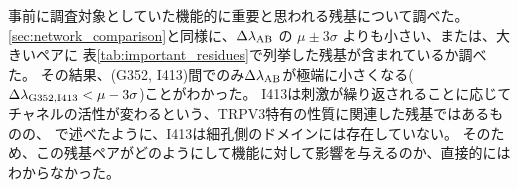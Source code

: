 事前に調査対象としていた機能的に重要と思われる残基について調べた。
\ref{sec:network_comparison}と同様に、$\Delta \lambda_{\rm{AB}}$ の $\mu \pm 3 \sigma$ よりも小さい、または、大きいペアに
表\ref{tab:important_residues}で列挙した残基が含まれているか調べた。
その結果、(G352, I413)間でのみ$\Delta \lambda_{\rm{AB}}$が極端に小さくなる($\Delta \lambda_{\rm{G352},\rm{I413}} < \mu - 3\sigma$)ことがわかった。
I413は刺激が繰り返されることに応じてチャネルの活性が変わるという、TRPV3特有の性質に関連した残基ではあるものの、
\label{sec:important_residues}で述べたように、I413は細孔側のドメインには存在していない。
そのため、この残基ペアがどのようにして機能に対して影響を与えるのか、直接的にはわからなかった。
